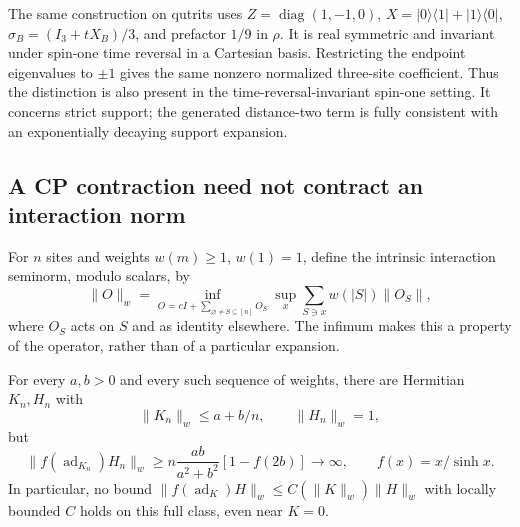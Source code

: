 The same construction on qutrits uses
$Z=\operatorname{diag}(1,-1,0)$,
$X=|0\rangle\langle1|+|1\rangle\langle0|$,
$\sigma_B=(I_3+tX_B)/3$, and prefactor $1/9$ in $\rho$.
It is real symmetric and invariant under spin-one time reversal in a
Cartesian basis.  Restricting the endpoint eigenvalues to $\pm1$ gives
the same nonzero normalized three-site coefficient.  Thus the
distinction is also present in the time-reversal-invariant spin-one
setting.  It concerns strict support; the generated distance-two term
is fully consistent with an exponentially decaying support expansion.

\subsection{A CP contraction need not contract an interaction norm}

For $n$ sites and weights $w(m)\geq1$, $w(1)=1$, define the intrinsic
interaction seminorm, modulo scalars, by
\begin{equation}
 \|O\|_w=
 \inf_{O=cI+\sum_{\varnothing\ne S\subseteq[n]}O_S}
 \sup_x\sum_{S\ni x}w(|S|)\|O_S\|,
 \label{q:intrinsic-norm}
\end{equation}
where $O_S$ acts on $S$ and as identity elsewhere.  The infimum makes
this a property of the operator, rather than of a particular expansion.

\begin{proposition}
\label{q:prop-filter-obstruction}
For every $a,b>0$ and every such sequence of weights, there are
Hermitian $K_n,H_n$ with
\[
 \|K_n\|_w\leq a+b/n,\qquad\|H_n\|_w=1,
\]
but
\begin{equation}
 \|f(\operatorname{ad}_{K_n})H_n\|_w
 \geq n\frac{ab}{a^2+b^2}[1-f(2b)]\longrightarrow\infty,
 \qquad f(x)=x/\sinh x.
 \label{q:interaction-blowup}
\end{equation}
In particular, no bound
$\|f(\operatorname{ad}_K)H\|_w\leq C(\|K\|_w)\|H\|_w$
with locally bounded $C$ holds on this full class, even near $K=0$.
\end{proposition}

